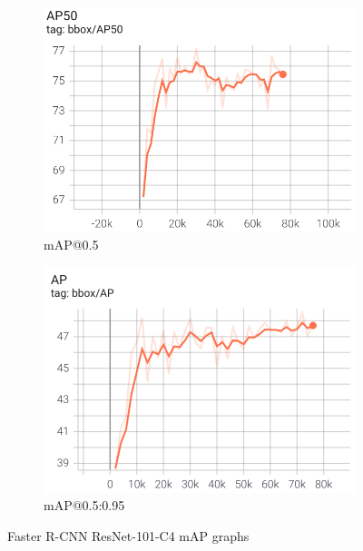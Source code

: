 \documentclass[conference]{IEEEtran}
\begin{document}
\begin{figure}[H]
\centering
\begin{subfigure}{.2\textwidth}
    \centering
    \includegraphics[width=1\linewidth]{Images/Faster/AP50.png}
    \caption{mAP@0.5}
\end{subfigure}%
\begin{subfigure}{.2\textwidth}
    \centering
    \includegraphics[width=1\linewidth]{Images/Faster/AP.png}
    \caption{mAP@0.5:0.95} 
\end{subfigure}
\caption{Faster R-CNN ResNet-101-C4 mAP graphs}
\label{fig:FasterRCNNmAP}
\end{figure}
\end{document}

